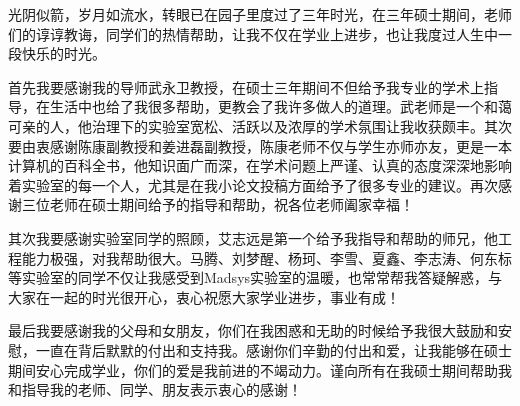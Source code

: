 \begin{acknowledgement}
	光阴似箭，岁月如流水，转眼已在园子里度过了三年时光，在三年硕士期间，老师们的谆谆教诲，同学们的热情帮助，让我不仅在学业上进步，也让我度过人生中一段快乐的时光。
	
	首先我要感谢我的导师武永卫教授，在硕士三年期间不但给予我专业的学术上指导，在生活中也给了我很多帮助，更教会了我许多做人的道理。武老师是一个和蔼可亲的人，他治理下的实验室宽松、活跃以及浓厚的学术氛围让我收获颇丰。其次要由衷感谢陈康副教授和姜进磊副教授，陈康老师不仅与学生亦师亦友，更是一本计算机的百科全书，他知识面广而深，在学术问题上严谨、认真的态度深深地影响着实验室的每一个人，尤其是在我小论文投稿方面给予了很多专业的建议。再次感谢三位老师在硕士期间给予的指导和帮助，祝各位老师阖家幸福！
	
	其次我要感谢实验室同学的照顾，艾志远是第一个给予我指导和帮助的师兄，他工程能力极强，对我帮助很大。马腾、刘梦醒、杨珂、李雪、夏鑫、李志涛、何东标等实验室的同学不仅让我感受到Madsys实验室的温暖，也常常帮我答疑解惑，与大家在一起的时光很开心，衷心祝愿大家学业进步，事业有成！
	
	最后我要感谢我的父母和女朋友，你们在我困惑和无助的时候给予我很大鼓励和安慰，一直在背后默默的付出和支持我。感谢你们辛勤的付出和爱，让我能够在硕士期间安心完成学业，你们的爱是我前进的不竭动力。谨向所有在我硕士期间帮助我和指导我的老师、同学、朋友表示衷心的感谢！
	
\end{acknowledgement}
